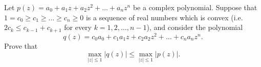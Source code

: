 \documentclass{article}
\begin{document}
\setlength{\parindent}{0pt}
Let $p(z)=a_{0}+a_{1}z+a_{2}z^{2}+\dots+a_{n}z^{n}$ be a complex polynomial. Suppose that $1=c_{0}\ge c_{1}\ge\dots\ge c_{n}\ge0$ is a sequence of real numbers which is convex (i.e. $2c_{k}\le c_{k-1}+c_{k+1}$ for every $k=1,2,\dots,n-1$), and consider the polynomial$$q(z)=c_{0}a_{0}+c_{1}a_{1}z+c_{2}a_{2}z^{2}+\dots+c_{n}a_{n}z^{n}.$$Prove that$$\max_{|z|\le1}|q(z)|\le\max_{|z|\le1}|p(z)|.$$
\end{document}
